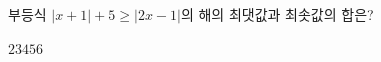 부등식 $|x+1|+5\ge |2x-1|$의 해의 최댓값과 최솟값의 합은?
\begin{choices32}{$2$}{$3$}{$4$}{$5$}{$6$}\end{choices32}
